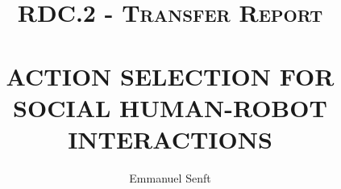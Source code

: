 \documentclass[12pt,a4paper]{report}
\title{	\normalsize \textsc{RDC.2 - Transfer Report} 	%
		 	\\[2.0cm]													%
			\HRule{0.5pt} \\										%
			\LARGE \textbf{\uppercase{Action Selection for Social Human-Robot Interactions}}	%
			\HRule{2pt} \\ [0.5cm]								%
		}
\author{
		Emmanuel Senft\\
}
\begin{document}
\renewcommand\bibname{References} %


%
%

\tableofcontents

\newpage
{} %






\begin{comment}

\listoffigures





\end{comment}
\end{document}
